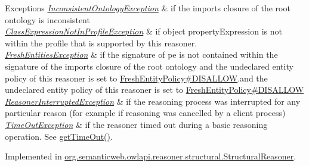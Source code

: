 \begin{DoxyExceptions}{Exceptions}
{\em \hyperlink{classorg_1_1semanticweb_1_1owlapi_1_1reasoner_1_1_inconsistent_ontology_exception}{Inconsistent\-Ontology\-Exception}} & if the imports closure of the root ontology is inconsistent \\
\hline
{\em \hyperlink{classorg_1_1semanticweb_1_1owlapi_1_1reasoner_1_1_class_expression_not_in_profile_exception}{Class\-Expression\-Not\-In\-Profile\-Exception}} & if {\ttfamily object property\-Expression} is not within the profile that is supported by this reasoner. \\
\hline
{\em \hyperlink{classorg_1_1semanticweb_1_1owlapi_1_1reasoner_1_1_fresh_entities_exception}{Fresh\-Entities\-Exception}} & if the signature of {\ttfamily pe} is not contained within the signature of the imports closure of the root ontology and the undeclared entity policy of this reasoner is set to \hyperlink{enumorg_1_1semanticweb_1_1owlapi_1_1reasoner_1_1_fresh_entity_policy_a762eae6d5b2449d125311ecaabfdc8d0}{Fresh\-Entity\-Policy\#\-D\-I\-S\-A\-L\-L\-O\-W}.and the undeclared entity policy of this reasoner is set to \hyperlink{enumorg_1_1semanticweb_1_1owlapi_1_1reasoner_1_1_fresh_entity_policy_a762eae6d5b2449d125311ecaabfdc8d0}{Fresh\-Entity\-Policy\#\-D\-I\-S\-A\-L\-L\-O\-W} \\
\hline
{\em \hyperlink{classorg_1_1semanticweb_1_1owlapi_1_1reasoner_1_1_reasoner_interrupted_exception}{Reasoner\-Interrupted\-Exception}} & if the reasoning process was interrupted for any particular reason (for example if reasoning was cancelled by a client process) \\
\hline
{\em \hyperlink{classorg_1_1semanticweb_1_1owlapi_1_1reasoner_1_1_time_out_exception}{Time\-Out\-Exception}} & if the reasoner timed out during a basic reasoning operation. See \hyperlink{interfaceorg_1_1semanticweb_1_1owlapi_1_1reasoner_1_1_o_w_l_reasoner_a44b2c968f989afe5290db29c90faa164}{get\-Time\-Out()}. \\
\hline
\end{DoxyExceptions}


Implemented in \hyperlink{classorg_1_1semanticweb_1_1owlapi_1_1reasoner_1_1structural_1_1_structural_reasoner_a143737166aaabb1f689296f023defe6a}{org.\-semanticweb.\-owlapi.\-reasoner.\-structural.\-Structural\-Reasoner}.


